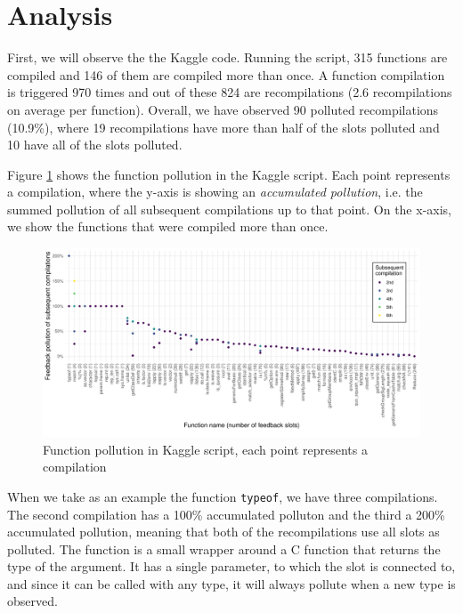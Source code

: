 \section{Analysis}

First, we will observe the the Kaggle code. Running the script, 315 functions are compiled and 146 of them are compiled more than once. A function compilation is triggered 970 times and out of these 824 are recompilations (2.6 recompilations on average per function). Overall, we have observed 90 polluted recompilations (10.9\%), where 19 recompilations have more than half of the slots polluted and 10 have all of the slots polluted.

Figure \ref{fig:kaggle-pollution} shows the function pollution in the Kaggle script. Each point represents a compilation, where the y-axis is showing an \textit{accumulated pollution}, i.e. the summed pollution of all subsequent compilations up to that point. On the x-axis, we show the functions that were compiled more than once.

\begin{figure}
	\centering
	\begin{adjustwidth}{-2cm}{-2cm}
		\includegraphics[width=1.3\textwidth]{figures/pollution/master/kaggle-function-pollution.pdf}
	\end{adjustwidth}
	\caption{Function pollution in Kaggle script, each point represents a compilation\cite{feedback-vmil}}\label{fig:kaggle-pollution}
\end{figure}

When we take as an example the function \texttt{typeof}, we have three compilations. The second compilation has a 100\% accumulated polluton and the third a 200\% accumulated pollution, meaning that both of the recompilations use all slots as polluted. The function is a small wrapper around a C function that returns the type of the argument. It has a single parameter, to which the slot is connected to, and since it can be called with any type, it will always pollute when a new type is observed.

